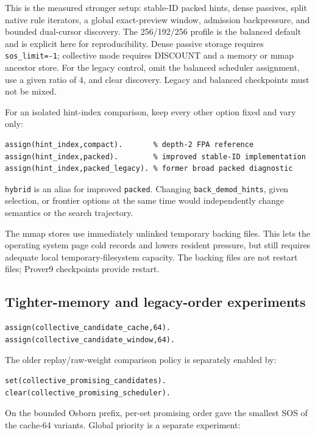 \documentclass[11pt]{article}
\newcommand{\setting}[1]{\texttt{#1}}
\begin{document}
This is the measured stronger setup: stable-ID packed hints, dense passives,
split native rule iterators, a global exact-preview window, admission
backpressure, and bounded dual-cursor discovery.  The 256/192/256 profile is
the balanced default and is explicit here for reproducibility.  Dense passive
storage requires \setting{sos\_limit=-1}; collective mode requires DISCOUNT
and a memory or mmap ancestor store.  For the legacy control, omit the
balanced scheduler assignment, use a given ratio of 4, and clear discovery.
Legacy and balanced checkpoints must not be mixed.

For an isolated hint-index comparison, keep every other option fixed and vary
only:

\begin{lstlisting}
assign(hint_index,compact).       % depth-2 FPA reference
assign(hint_index,packed).        % improved stable-ID implementation
assign(hint_index,packed_legacy). % former broad packed diagnostic
\end{lstlisting}

\setting{hybrid} is an alias for improved \setting{packed}.  Changing
\setting{back\_demod\_hints}, given selection, or frontier options at the same
time would independently change semantics or the search trajectory.

The mmap stores use immediately unlinked temporary backing files.  This lets
the operating system page cold records and lowers resident pressure, but still
requires adequate local temporary-filesystem capacity.  The backing files are
not restart files; Prover9 checkpoints provide restart.

\subsection{Tighter-memory and legacy-order experiments}

\begin{lstlisting}
assign(collective_candidate_cache,64).
assign(collective_candidate_window,64).
\end{lstlisting}

The older replay/raw-weight comparison policy is separately enabled by:

\begin{lstlisting}
set(collective_promising_candidates).
clear(collective_promising_scheduler).
\end{lstlisting}

On the bounded Osborn prefix, per-set promising order gave the smallest SOS of
the cache-64 variants.  Global priority is a separate experiment:
\end{document}
